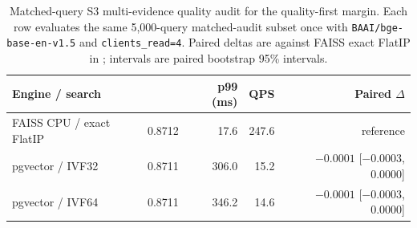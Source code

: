 \begin{table}[t]
\centering
\footnotesize
\setlength{\tabcolsep}{3pt}
\caption{Matched-query S3 multi-evidence quality audit for the quality-first margin. Each row evaluates the same 5{,}000-query \hotpotmaxionbench{} matched-audit subset once with \texttt{BAAI/bge-base-en-v1.5} and \texttt{clients\_read=4}. Paired deltas are against FAISS exact FlatIP in \ecov{}; intervals are paired bootstrap 95\% intervals.}
\label{tab:s3-paired-quality}
\begin{tabular}{lrrrr}
\toprule
Engine / search & \ecov{} & p99 (ms) & QPS & Paired $\Delta$ \ecov{} \\
\midrule
FAISS CPU / exact FlatIP & 0.8712 & 17.6 & 247.6 & reference \\
pgvector / IVF32 & 0.8711 & 306.0 & 15.2 & $-0.0001$ [$-0.0003$, 0.0000] \\
pgvector / IVF64 & 0.8711 & 346.2 & 14.6 & $-0.0001$ [$-0.0003$, 0.0000] \\
\bottomrule
\end{tabular}
\end{table}
